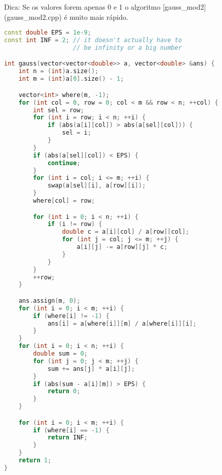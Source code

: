 \documentclass[11pt, a4paper, oneside]{book}
\begin{document}
Dica: Se os valores forem apenas 0 e 1 o algoritmo [gauss\_mod2](gauss\_mod2.cpp) é muito mais rápido. 

\hfill

\begin{multicols}{2}
\begin{lstlisting}[language=C++]
const double EPS = 1e-9;
const int INF = 2; // it doesn't actually have to
                   // be infinity or a big number

int gauss(vector<vector<double>> a, vector<double> &ans) {
    int n = (int)a.size();
    int m = (int)a[0].size() - 1;

    vector<int> where(m, -1);
    for (int col = 0, row = 0; col < m && row < n; ++col) {
        int sel = row;
        for (int i = row; i < n; ++i) {
            if (abs(a[i][col]) > abs(a[sel][col])) {
                sel = i;
            }
        }
        if (abs(a[sel][col]) < EPS) {
            continue;
        }
        for (int i = col; i <= m; ++i) {
            swap(a[sel][i], a[row][i]);
        }
        where[col] = row;

        for (int i = 0; i < n; ++i) {
            if (i != row) {
                double c = a[i][col] / a[row][col];
                for (int j = col; j <= m; ++j) {
                    a[i][j] -= a[row][j] * c;
                }
            }
        }
        ++row;
    }

    ans.assign(m, 0);
    for (int i = 0; i < m; ++i) {
        if (where[i] != -1) {
            ans[i] = a[where[i]][m] / a[where[i]][i];
        }
    }
    for (int i = 0; i < n; ++i) {
        double sum = 0;
        for (int j = 0; j < m; ++j) {
            sum += ans[j] * a[i][j];
        }
        if (abs(sum - a[i][m]) > EPS) {
            return 0;
        }
    }

    for (int i = 0; i < m; ++i) {
        if (where[i] == -1) {
            return INF;
        }
    }
    return 1;
}
\end{lstlisting}
\end{multicols}

\hfill
\end{document}
